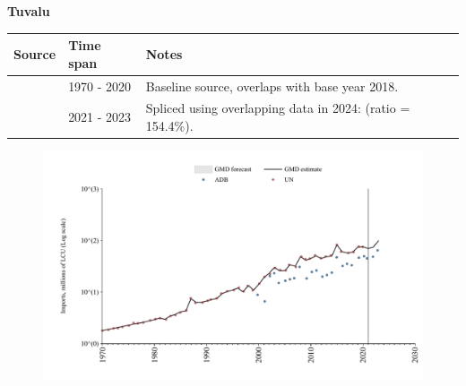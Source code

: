 \documentclass[12pt,a4paper,landscape]{article}
\begin{document}
\begin{adjustbox}{max totalsize={\paperwidth}{\paperheight},center}
\begin{minipage}[t][\textheight][t]{\textwidth}
\vspace*{0.5cm}
{}
\begin{center}
{\Large\bfseries Tuvalu}
\end{center}
\vspace{0.5cm}
\begin{table}[H]
\centering
\small
\begin{tabular}{|l|l|l|}
\hline
\textbf{Source} & \textbf{Time span} & \textbf{Notes} \\
\hline
\rowcolor{white}\cite{UN}& 1970 - 2020 &Baseline source, overlaps with base year 2018.\\
\rowcolor{lightgray}\cite{ADB}& 2021 - 2023 &Spliced using overlapping data in 2024: (ratio = 154.4\%).\\
\hline
\end{tabular}
\end{table}
\begin{figure}[H]
\centering
\includegraphics[width=\textwidth,height=0.6\textheight,keepaspectratio]{graphs/TUV_imports.pdf}
\end{figure}
\end{minipage}
\end{adjustbox}
\end{document}
